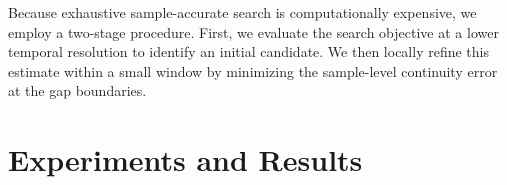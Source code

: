 \documentclass{article}
\begin{document}

Because exhaustive sample-accurate search is computationally expensive, we employ a two-stage procedure. First, we evaluate the search objective at a lower temporal resolution to identify an initial candidate. We then locally refine this estimate within a small window by minimizing the sample-level continuity error at the gap boundaries.





\vspace{-5pt}
\section{Experiments and Results}
\vspace{-3pt}
\end{document}
